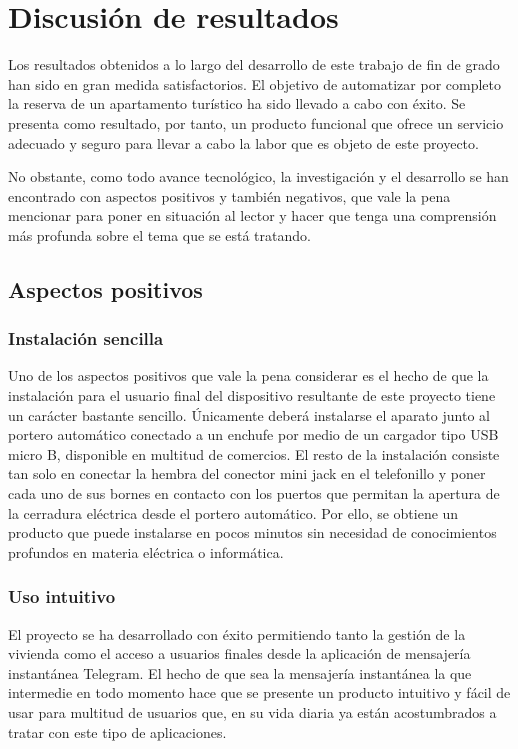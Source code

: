 \chapter{Discusión de resultados}
\label{ch:discusion-resultados}

Los resultados obtenidos a lo largo del desarrollo de este trabajo de fin de grado han sido en gran medida satisfactorios. El objetivo de automatizar por completo la reserva de un apartamento turístico ha sido llevado a cabo con éxito. Se presenta como resultado, por tanto, un producto funcional que ofrece un servicio adecuado y seguro para llevar a cabo la labor que es objeto de este proyecto.

No obstante, como todo avance tecnológico, la investigación y el desarrollo se han encontrado con aspectos positivos y también negativos, que vale la pena mencionar para poner en situación al lector y hacer que tenga una comprensión más profunda sobre el tema que se está tratando.

\section{Aspectos positivos}
\subsection{Instalación sencilla}
Uno de los aspectos positivos que vale la pena considerar es el hecho de que la instalación para el usuario final del dispositivo resultante de este proyecto tiene un carácter bastante sencillo. Únicamente deberá instalarse el aparato junto al portero automático conectado a un enchufe por medio de un cargador tipo USB micro B, disponible en multitud de comercios. El resto de la instalación consiste tan solo en conectar la hembra del conector mini jack en el telefonillo y poner cada uno de sus bornes en contacto con los puertos que permitan la apertura de la cerradura eléctrica desde el portero automático. Por ello, se obtiene un producto que puede instalarse en pocos minutos sin necesidad de conocimientos profundos en materia eléctrica o informática.
\subsection{Uso intuitivo}
El proyecto se ha desarrollado con éxito permitiendo tanto la gestión de la vivienda como el acceso a usuarios finales desde la aplicación de mensajería instantánea Telegram. El hecho de que sea la mensajería instantánea la que intermedie en todo momento hace que se presente un producto intuitivo y fácil de usar para multitud de usuarios que, en su vida diaria ya están acostumbrados a tratar con este tipo de aplicaciones.
